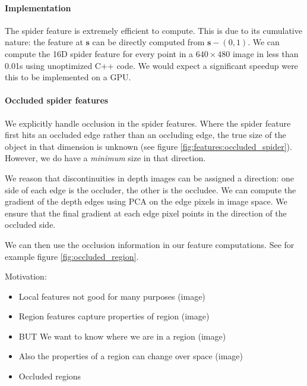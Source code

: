 \documentclass[10pt,twocolumn,letterpaper]{article}
\newcommand{\pixelidx}{\mathbf{s}}
\begin{document}
\paragraph{Implementation}
The spider feature is extremely efficient to compute.
This is due to its cumulative nature: the feature at $\pixelidx$ can be directly computed from $\pixelidx - (0, 1)$.
We can compute the 16D spider feature for every point in a $640\times480$ image in less than 0.01s using unoptimized C++ code.
We would expect a significant speedup were this to be implemented on a GPU.


\paragraph{Occluded spider features}

We explicitly handle occlusion in the spider features. Where the spider feature first hits an occluded edge rather than an occluding edge, the true size of the object in that dimension is unknown (see figure \ref{fig:features:occluded_spider}).
However, we do have a \textit{minimum} size in that direction.

We reason that discontinuities in depth images can be assigned a direction: one side of each edge is the occluder, the other is the occludee. 
We can compute the gradient of the depth edges using PCA on the edge pixels in image space.
We ensure that the final gradient at each edge pixel points in the direction of the occluded side.

We can then use the occlusion information in our feature computations.
See for example figure \ref{fig:occluded_region}.

Motivation:
\begin{itemize}
\item Local features not good for many purposes (image)
\item Region features capture properties of region (image)
\item BUT We want to know where we are in a region  (image)
\item Also the properties of a region can change over space (image)
\item Occluded regions
\end{itemize}




\end{document}
